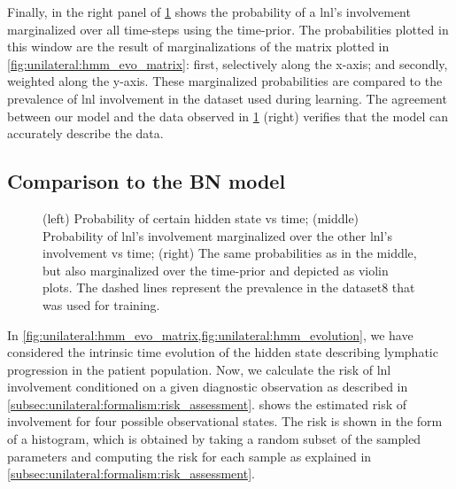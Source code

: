 \documentclass[\relativeRoot/main.tex]{subfiles}
\begin{document}
Finally, in the right panel of \cref{fig:unilateral:hmm_evolution} shows the probability of a \gls{lnl}'s involvement marginalized over all time-steps using the time-prior. The probabilities plotted in this window are the result of marginalizations of the matrix plotted in \cref{fig:unilateral:hmm_evo_matrix}: first, selectively along the x-axis; and secondly, weighted along the y-axis. These marginalized probabilities are compared to the prevalence of \gls{lnl} involvement in the dataset used during learning. The agreement between our model and the data observed in \cref{fig:unilateral:hmm_evolution} (right) verifies that the model can accurately describe the data.

\subsection{Comparison to the BN model}
\label{subsec:unilateral:application:comp_to_bn}

\begin{figure}
    \centering
    \def\svgwidth{1.01\textwidth}
    
    \caption{(left) Probability of certain hidden state vs time; (middle) Probability of \gls{lnl}'s involvement marginalized over the other \gls{lnl}'s involvement vs time; (right) The same probabilities as in the middle, but also marginalized over the time-prior and depicted as violin plots. The dashed lines represent the prevalence in the dataset8 that was used for training.}
    \label{fig:unilateral:hmm_evolution}
\end{figure}

In \cref{fig:unilateral:hmm_evo_matrix,fig:unilateral:hmm_evolution}, we have considered the intrinsic time evolution of the hidden state describing lymphatic progression in the patient population. Now, we calculate the risk of \gls{lnl} involvement conditioned on a given diagnostic observation as described in \cref{subsec:unilateral:formalism:risk_assessment}.  shows the estimated risk of involvement for four possible observational states. The risk is shown in the form of a histogram, which is obtained by taking a random subset of the sampled parameters and computing the risk for each sample as explained in \cref{subsec:unilateral:formalism:risk_assessment}.
\end{document}
